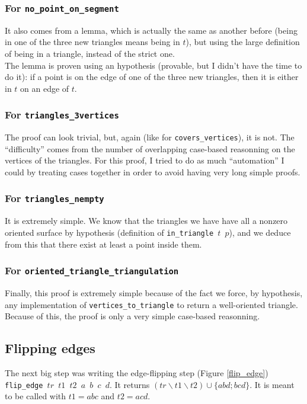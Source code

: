 \documentclass[a4paper,10pt]{article}
\begin{document}
  \subsubsection{For {\tt no\_point\_on\_segment}}

  It also comes from a lemma, which is actually the same as another before (being in one of the three new triangles means being in $t$), but using the large definition of being in a triangle, instead of the strict one.\\
  The lemma is proven using an hypothesis (provable, but I didn't have the time to do it): if a point is on the edge of one of the three new triangles, then it is either in $t$ on an edge of $t$.
  
  \subsubsection{For {\tt triangles\_3vertices}}

  The proof can look trivial, but, again (like for {\tt covers\_vertices}), it is not. The ``difficulty'' comes from the number of overlapping case-based reasonning on the vertices of the triangles. For this proof, I tried to do as much ``automation'' I could by treating cases together in order to avoid having very long simple proofs.
  
  \subsubsection{For {\tt triangles\_nempty}}

  It is extremely simple. We know that the triangles we have have all a nonzero oriented surface by hypothesis (definition of {\tt in\_triangle $t$ $p$}), and we deduce from this that there exist at least a point inside them.

  \subsubsection{For {\tt oriented\_triangle\_triangulation}}
  \label{oriented_simple}
  Finally, this proof is extremely simple because of the fact we force, by hypothesis, any implementation of {\tt vertices\_to\_triangle} to return a well-oriented triangle. Because of this, the proof is only a very simple case-based reasonning.

  
\subsection{Flipping edges}
The next big step was writing the edge-flipping step (Figure \ref{flip_edge}) {\tt flip\_edge $tr$ $t1$ $t2$ $a$ $b$ $c$ $d$}.
It returns $(tr \smallsetminus t1 \smallsetminus t2) \cup \{abd;bcd\}$. It is meant to be called with $t1 = abc$ and $t2=acd$.
\end{document}
